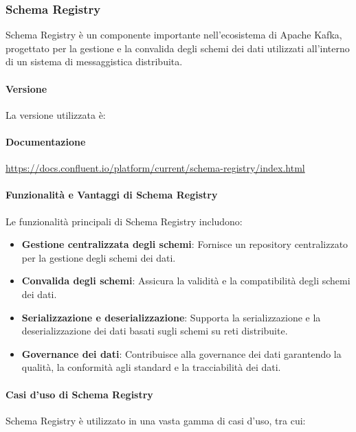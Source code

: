 \subsubsection{Schema Registry}
Schema Registry è un componente importante nell'ecosistema di Apache Kafka, progettato per la gestione e la convalida degli schemi dei dati utilizzati all'interno di un sistema di messaggistica distribuita.
\paragraph{Versione}
La versione utilizzata è: 
\paragraph{Documentazione}
\href{https://docs.confluent.io/platform/current/schema-registry/index.html}{https://docs.confluent.io/platform/current/schema-registry/index.html}

\paragraph{Funzionalità e Vantaggi di Schema Registry}
Le funzionalità principali di Schema Registry includono:
\begin{itemize}
    \item \textbf{Gestione centralizzata degli schemi}: Fornisce un repository centralizzato per la gestione degli schemi dei dati.
    \item \textbf{Convalida degli schemi}: Assicura la validità e la compatibilità degli schemi dei dati.
    \item \textbf{Serializzazione e deserializzazione}: Supporta la serializzazione e la deserializzazione dei dati basati sugli schemi su reti distribuite.
    \item \textbf{Governance dei dati}: Contribuisce alla governance dei dati garantendo la qualità, la conformità agli standard e la tracciabilità dei dati.
\end{itemize}

\paragraph{Casi d'uso di Schema Registry}

Schema Registry è utilizzato in una vasta gamma di casi d'uso, tra cui:

